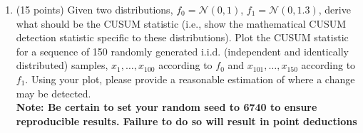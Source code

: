 \documentclass[12pt]{article}
\begin{document}
\begin{enumerate}
\item  (15 points)  Given two distributions, $f_0 = \mathcal{N}(0, 1)$, $f_1 = \mathcal{N}(0, 1.3)$, derive what should be the CUSUM statistic (i.e., show the mathematical CUSUM detection statistic specific to these distributions). Plot the CUSUM statistic for a sequence of 150 randomly generated i.i.d. (independent and identically distributed) samples, $x_1, \ldots, x_{100}$ according to $f_0$ and $x_{101}, \ldots, x_{150}$ according to $f_1$. Using your plot, please provide a reasonable estimation of where a change may be detected.\\
\textbf{Note: Be certain to set your random seed to 6740 to ensure reproducible results. Failure to do so will result in point deductions}


\end{enumerate}
\end{document}
